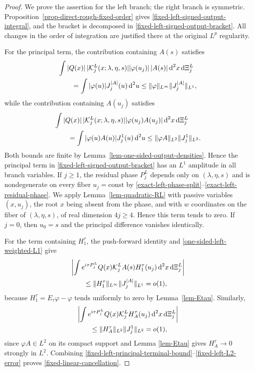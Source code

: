 \documentclass[a4paper,11pt]{article}
\newcommand{\dd}{\,\text{d}}
\theoremstyle{plain}
\theoremstyle{definition}
\theoremstyle{remark}
\begin{document}
\begin{proof}
We prove the assertion for the left branch; the right branch is symmetric. Proposition~\ref{prop-direct-rough-fixed-order} gives \eqref{fixed-left-signed-output-integral}, and the bracket is decomposed in \eqref{fixed-left-signed-output-bracket}. All changes in the order of integration are justified there at the original $L^p$ regularity.

For the principal term, the contribution containing $A(s)$ satisfies
\begin{align}
&\int |Q(x)|\,|\mathcal K_j^L(x;\lambda,\eta,s)|
 |\varphi(u_j)|\,|A(s)|\dd^2x\dd\Xi_j^L \notag\\
&\qquad=\int |\varphi(u)|J_j^{|A|}(u)\dd^2u
 \le \|\varphi\|_{L^\infty}\|J_j^{|A|}\|_{L^1},
\label{fixed-left-principal-terminal-bound}
\end{align}
while the contribution containing $A(u_j)$ satisfies
\begin{align}
&\int |Q(x)|\,|\mathcal K_j^L(x;\lambda,\eta,s)|
 |\varphi(u_j)A(u_j)|\dd^2x\dd\Xi_j^L \notag\\
&\qquad=\int |\varphi(u)A(u)|J_j^1(u)\dd^2u
 \le \|\varphi A\|_{L^2}\|J_j^1\|_{L^2}.
\label{fixed-left-principal-output-bound}
\end{align}
Both bounds are finite by Lemma~\ref{lem-one-sided-output-densities}.  Hence the principal term in
\eqref{fixed-left-signed-output-bracket} has an $L^1$ amplitude in all branch
variables.  If $j\geq1$, the residual phase $P_j^L$ depends only on
$(\lambda,\eta,s)$ and is nondegenerate on every fiber $u_j=\mathrm{const}$ by
\eqref{exact-left-phase-split}--\eqref{exact-left-residual-phase}.  We apply
Lemma~\ref{lem-quadratic-RL} with passive variables $(x,u_j)$, the root $x$
being absent from the phase, and with $w$ coordinates on the fiber of
$(\lambda,\eta,s)$, of real dimension $4j\ge4$.  Hence this term tends to zero.  If
$j=0$, then $u_0=s$ and the principal difference vanishes identically.

For the term containing $H_1^\tau$, the push-forward identity and \eqref{one-sided-left-weighted-L1} give
\begin{align}
&\left|\int e^{i\tau P_j^L}Q(x)\mathcal K_j^L
 A(s)H_1^\tau(u_j)\dd^2x\dd\Xi_j^L\right| \notag\\
&\qquad\le \|H_1^\tau\|_{L^\infty}
 \|J_j^{|A|}\|_{L^1}=o(1),
\label{fixed-left-smooth-error}
\end{align}
because $H_1^\tau=E_\tau\varphi-\varphi$ tends uniformly to zero by Lemma~\ref{lem-Etau}.  Similarly,
\begin{align}
&\left|\int e^{i\tau P_j^L}Q(x)\mathcal K_j^L
 H_A^\tau(u_j)\dd^2x\dd\Xi_j^L\right| \notag\\
&\qquad\le \|H_A^\tau\|_{L^2}\|J_j^1\|_{L^2}=o(1),
\label{fixed-left-L2-error}
\end{align}
since $\varphi A\in L^2$ on its compact support and Lemma
\ref{lem-Etau} gives $H_A^\tau\to0$ strongly in $L^2$.  Combining
\eqref{fixed-left-principal-terminal-bound}--\eqref{fixed-left-L2-error}
proves \eqref{fixed-linear-cancellation}.


\end{proof}
\end{document}
